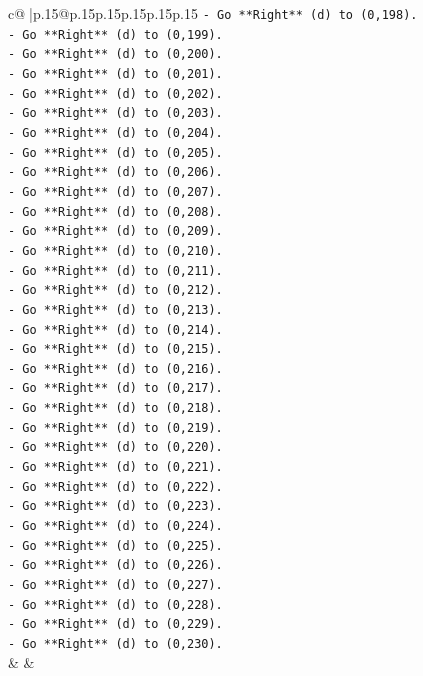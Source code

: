 \documentclass{article}
\begin{document}
{\begin{supertabular}{c@{$\;$}|p{.15\linewidth}@{}p{.15\linewidth}p{.15\linewidth}p{.15\linewidth}p{.15\linewidth}p{.15\linewidth}}
{{{\texttt{{-} Go **Right** (d) to (0,198).} \\
\texttt{{-} Go **Right** (d) to (0,199).} \\
\texttt{{-} Go **Right** (d) to (0,200).} \\
\texttt{{-} Go **Right** (d) to (0,201).} \\
\texttt{{-} Go **Right** (d) to (0,202).} \\
\texttt{{-} Go **Right** (d) to (0,203).} \\
\texttt{{-} Go **Right** (d) to (0,204).} \\
\texttt{{-} Go **Right** (d) to (0,205).} \\
\texttt{{-} Go **Right** (d) to (0,206).} \\
\texttt{{-} Go **Right** (d) to (0,207).} \\
\texttt{{-} Go **Right** (d) to (0,208).} \\
\texttt{{-} Go **Right** (d) to (0,209).} \\
\texttt{{-} Go **Right** (d) to (0,210).} \\
\texttt{{-} Go **Right** (d) to (0,211).} \\
\texttt{{-} Go **Right** (d) to (0,212).} \\
\texttt{{-} Go **Right** (d) to (0,213).} \\
\texttt{{-} Go **Right** (d) to (0,214).} \\
\texttt{{-} Go **Right** (d) to (0,215).} \\
\texttt{{-} Go **Right** (d) to (0,216).} \\
\texttt{{-} Go **Right** (d) to (0,217).} \\
\texttt{{-} Go **Right** (d) to (0,218).} \\
\texttt{{-} Go **Right** (d) to (0,219).} \\
\texttt{{-} Go **Right** (d) to (0,220).} \\
\texttt{{-} Go **Right** (d) to (0,221).} \\
\texttt{{-} Go **Right** (d) to (0,222).} \\
\texttt{{-} Go **Right** (d) to (0,223).} \\
\texttt{{-} Go **Right** (d) to (0,224).} \\
\texttt{{-} Go **Right** (d) to (0,225).} \\
\texttt{{-} Go **Right** (d) to (0,226).} \\
\texttt{{-} Go **Right** (d) to (0,227).} \\
\texttt{{-} Go **Right** (d) to (0,228).} \\
\texttt{{-} Go **Right** (d) to (0,229).} \\
\texttt{{-} Go **Right** (d) to (0,230).} \\
            }
        }
    }
    & & \\ \\


\end{supertabular}}
\end{document}
